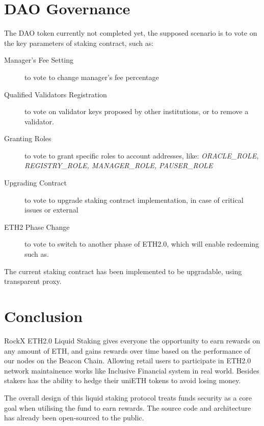 \documentclass{article}
\begin{document}
\section{DAO Governance}
The DAO token currently not completed yet, the supposed scenario is to vote on the key parameters of staking contract, such as:

\begin{description}
   \item[Manager's Fee Setting] to vote to change manager's fee percentage
   \item[Qualified Validators Registration] to vote on validator keys proposed by other institutions, or to remove a validator.
	\item[Granting Roles] to vote to grant specific roles to account addresses, like: \textit{ORACLE\_ROLE, REGISTRY\_ROLE, MANAGER\_ROLE, PAUSER\_ROLE} 
	\item[Upgrading Contract] to vote to upgrade staking contract implementation, in case of critical issues or external
	\item[ETH2 Phase Change] to vote to switch to another phase of ETH2.0, which will enable redeeming such as.
\end{description}

The current staking contract has been implemented to be upgradable, using transparent proxy.

\section{Conclusion}
RockX ETH2.0 Liquid Staking gives everyone the opportunity to earn rewards on any amount of ETH,  and gains 
rewards over time based on the performance of our nodes on the Beacon Chain. Allowing retail users to
participate in ETH2.0 network maintainence works like Inclusive Financial system in real world. Besides stakers has 
the ability to hedge their uniETH tokens to avoid losing money.

The overall design of this liquid staking protocol treats funds security as a core goal when utilising the fund to earn rewards. The source code and architecture has already been open-sourced to the public.

\newpage
\appendix
\end{document}
